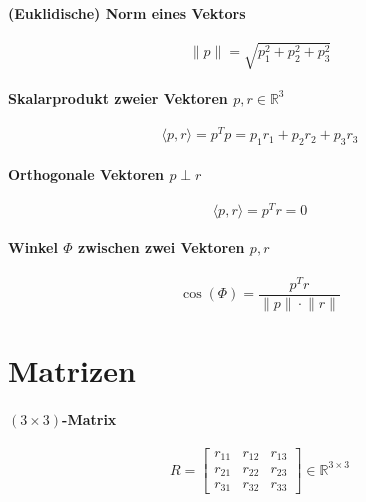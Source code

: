 \documentclass[a4paper, 11pt, accentcolor = tud3b]{tudreport}
\begin{document}
			\paragraph{(Euklidische) Norm eines Vektors}
			\begin{equation*}
		        \lVert p \rVert = \sqrt{p _ 1 ^ 2 + p _ 2 ^ 2 + p _ 3 ^ 2}
	        \end{equation*}
	        
	        \paragraph{Skalarprodukt zweier Vektoren \( p, r \in \mathbb{R} ^ 3 \)}
	        \begin{equation*}
		        \langle p, r \rangle = p ^ T p = p _ 1 r _ 1 + p _ 2 r _ 2 + p _ 3 r _ 3
	        \end{equation*}
	        
	        \paragraph{Orthogonale Vektoren \( p \perp r \)}
	        \begin{equation*}
		        \langle p, r \rangle = p ^ T r = 0
	        \end{equation*}
	        
	        \paragraph{Winkel \( \Phi \) zwischen zwei Vektoren \( p, r \)}
	        \begin{equation*}
		        \cos(\Phi) = \frac{p ^ T r}{\lVert p \rVert \cdot \lVert r \rVert}
	        \end{equation*}

        \section{Matrizen} %
	        \paragraph{\( (3 \times 3) \)-Matrix}
	        \begin{equation*}
		        R =
		        \begin{bmatrix}
			        r _ { 1 1 } & r _ { 1 2 } & r _ { 1 3 } \\
			        r _ { 2 1 } & r _ { 2 2 } & r _ { 2 3 } \\
			        r _ { 3 1 } & r _ { 3 2 } & r _ { 3 3 }
		        \end{bmatrix}
		        \in \mathbb{R} ^ { 3 \times 3 }
	        \end{equation*}
	        
\end{document}
